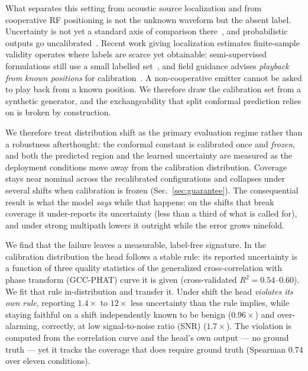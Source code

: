 \documentclass{article}
\def\x{\times}
\begin{document}
What separates this setting from acoustic source localization and from
cooperative RF positioning is not the unknown waveform but the absent
label. Uncertainty is not yet a standard axis of comparison there~\cite{grumiaux2022,pan2026,piyu2025}, and probabilistic outputs go uncalibrated~\cite{schymura2021}. Recent work giving
localization estimates finite-sample validity operates where labels are
scarce yet obtainable: semi-supervised formulations still use a small
labelled set~\cite{rozenfeld2025,michael2026}, and field guidance advises
\emph{playback from known positions} for
calibration~\cite{kampe2026}. A non-cooperative emitter cannot be asked to play
back from a known position. We therefore draw the calibration set from a synthetic generator, and the exchangeability that split
conformal prediction relies on is broken by construction.

We therefore treat distribution shift as the primary evaluation regime
rather than a robustness afterthought: the conformal constant is calibrated
once and \emph{frozen}, and both the predicted region and the learned
uncertainty are measured as the deployment conditions move away from the
calibration distribution. Coverage stays near nominal across the recalibrated
configurations and collapses under several shifts when calibration is
frozen (Sec.~\ref{sec:guarantee}). The consequential
result is what the model \emph{says} while that happens: on the shifts that
break coverage it under-reports its uncertainty (less than a third of what
is called for), and under strong multipath lowers it outright while the
error grows ninefold.

We find that the failure leaves a measurable, label-free signature.
In the calibration distribution the head follows a stable rule: its
reported uncertainty is a function of three quality statistics of the
generalized cross-correlation with phase transform (GCC-PHAT) curve it is given (cross-validated $R^2=0.54$--$0.60$). We fit
that rule in-distribution and transfer it. Under shift the head
\emph{violates its own rule}, reporting $1.4\x$ to $12\x$ less uncertainty
than the rule implies, while staying faithful on a shift independently
known to be benign ($0.96\x$) and over-alarming, correctly, at low
signal-to-noise ratio (SNR)
($1.7\x$). The violation is computed from the correlation curve and the
head's own output --- no ground truth --- yet it tracks the coverage that
does require ground truth (Spearman $0.74$ over eleven conditions).
\end{document}
